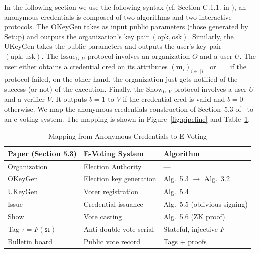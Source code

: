 \documentclass[a4paper]{article}
\begin{document}
In the following section we use the following syntax (cf. Section C.1.1. in \cite{mainPaper}), an anonymous credentials is composed of two algorithms and two interactive protocols. The $\text{OKeyGen}$ takes 
as input public parameters (those generated by $\text{Setup}$) and outputs the organization's key pair $(\text{opk}, \text{osk})$. 
Similarly, the $\text{UKeyGen}$ takes the public parameters and outputs the user's key pair $(\text{upk}, \text{usk})$. The $\text{Issue}_{O, U}$ protocol 
involves an organization $O$ and a user $U$. The user either obtains a credential $\text{cred}$ on its attributes $(\mathbf{m}_i)_{i \in [l]}$ or $\perp$ if the
protocol failed, on the other hand, the organization just gets notified of the success (or not) of the execution. Finally, the $\text{Show}_{U, V}$ protocol involves 
a user $U$ and a verifier $V$. It outputs $b = 1$ to $V$ if the credential $\text{cred}$ is valid and $b = 0$ otherwise. 
We map the anonymous credentials construction of Section~5.3 of~\cite{mainPaper} to an e-voting system. The mapping is shown in Figure~\ref{fig:pipeline} and Table~\ref{tab:mapping}.

\begin{table}[H]
    \centering
    \caption{Mapping from Anonymous Credentials to E-Voting}
    \label{tab:mapping}
    \begin{tabular}{lll}
        \toprule
        \textbf{Paper (Section 5.3)} & \textbf{E-Voting System} & \textbf{Algorithm}           \\
        \midrule
        Organization                 & Election Authority       & ---                          \\
        \textsf{OKeyGen}             & Election key generation  & Alg.~5.3 $\to$ Alg.~3.2      \\
        \textsf{UKeyGen}             & Voter registration       & Alg.~5.4                     \\
        \textsf{Issue}               & Credential issuance      & Alg.~5.5 (oblivious signing) \\
        \textsf{Show}                & Vote casting             & Alg.~5.6 (ZK proof)          \\
        Tag $\tau = F(\textsf{st})$  & Anti-double-vote serial  & Stateful, injective $F$      \\
        Bulletin board               & Public vote record       & Tags + proofs                \\
        \bottomrule
    \end{tabular}
\end{table}
\end{document}
